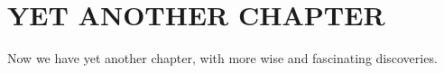 \chapter{YET ANOTHER CHAPTER}	\label{another chapter}

Now we have yet another chapter, with more wise and fascinating discoveries.

